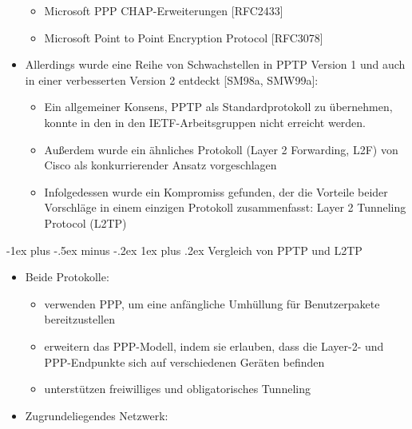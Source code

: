 \documentclass[a4paper]{article}
\makeatletter
\renewcommand{\subsubsection}{\@startsection{subsubsection}{3}{0mm}%
 {-1ex plus -.5ex minus -.2ex}%
 {1ex plus .2ex}%
 {\normalfont\small\bfseries}}
\makeatother
\begin{document}
\begin{multicols}{3}
\begin{itemize}
              \begin{itemize}
                  \item
                        Microsoft PPP CHAP-Erweiterungen {[}RFC2433{]}
                  \item
                        Microsoft Point to Point Encryption Protocol {[}RFC3078{]}
              \end{itemize}
        \item
              Allerdings wurde eine Reihe von Schwachstellen in PPTP Version 1 und
              auch in einer verbesserten Version 2 entdeckt {[}SM98a, SMW99a{]}:

              \begin{itemize}
                  \item
                        Ein allgemeiner Konsens, PPTP als Standardprotokoll zu übernehmen,
                        konnte in den in den IETF-Arbeitsgruppen nicht erreicht werden.
                  \item
                        Außerdem wurde ein ähnliches Protokoll (Layer 2 Forwarding, L2F) von
                        Cisco als konkurrierender Ansatz vorgeschlagen
                  \item
                        Infolgedessen wurde ein Kompromiss gefunden, der die Vorteile beider
                        Vorschläge in einem einzigen Protokoll zusammenfasst: Layer 2
                        Tunneling Protocol (L2TP)
              \end{itemize}
    \end{itemize}


    \subsubsection{Vergleich von PPTP und
        L2TP}

    \begin{itemize}
        \item
              Beide Protokolle:

              \begin{itemize}
                  \item
                        verwenden PPP, um eine anfängliche Umhüllung für Benutzerpakete
                        bereitzustellen
                  \item
                        erweitern das PPP-Modell, indem sie erlauben, dass die Layer-2- und
                        PPP-Endpunkte sich auf verschiedenen Geräten befinden
                  \item
                        unterstützen freiwilliges und obligatorisches Tunneling
              \end{itemize}
        \item
              Zugrundeliegendes Netzwerk:


\end{itemize}
\end{multicols}
\end{document}
